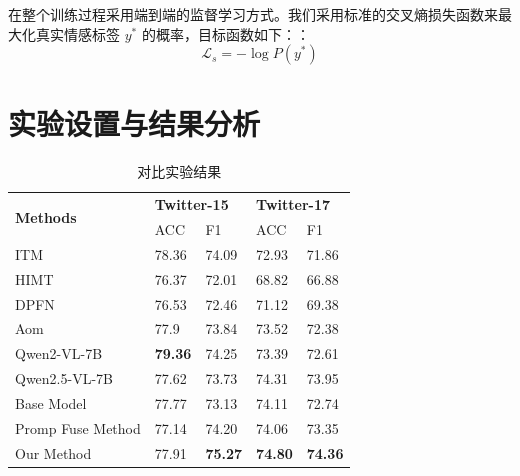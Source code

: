 在整个训练过程采用端到端的监督学习方式。我们采用标准的交叉熵损失函数来最大化真实情感标签 $y^*$ 的概率，目标函数如下：：
\begin{equation}
    \mathcal{L}_{s}=-\log P(y^*)
\end{equation}


\section{实验设置与结果分析}

\begin{table}[t]
\centering
\caption{\label{second:mainresult}
    对比实验结果
    }
\begin{tabular}{l|llll}
\toprule
\multirow{2}{*}{\textbf{Methods}} & \multicolumn{2}{l}{\textbf{Twitter-15}} & \multicolumn{2}{l}{\textbf{Twitter-17}} \\
   & ACC                 & F1                 & ACC                 & F1                 \\ \hline
ITM                               & 78.36               & 74.09              & 72.93               & 71.86              \\
HIMT                              & 76.37               & 72.01              & 68.82               & 66.88              \\
DPFN                              & 76.53               & 72.46              & 71.12               & 69.38              \\
Aom                               & 77.9                & 73.84              & 73.52               & 72.38              \\
Qwen2-VL-7B                       & \textbf{79.36}               & 74.25              & 73.39               & 72.61              \\
Qwen2.5-VL-7B                     & 77.62               & 73.73              & 74.31               & 73.95              \\
\hline
Base Model         & 77.77               & 73.13              & 74.11               & 72.74              \\
Promp Fuse Method            & 77.14          & 74.20           & 74.06           & 73.35         \\
Our Method        &  77.91        & \textbf{75.27}              & \textbf{74.80}                & \textbf{74.36}              \\ 
\bottomrule
\end{tabular}%
\end{table}

